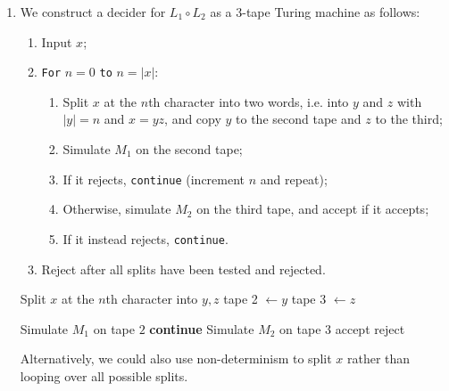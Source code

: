 \documentclass{article}
\theoremstyle{definition}
\theoremstyle{definition}
\theoremstyle{remark}
\begin{document}
\begin{enumerate}
    \item[$(ii)$] We construct a decider for $L_1\circ L_2$ as a $3$-tape Turing machine as follows:
    \begin{enumerate}
        \item[(1)] Input $x$;
        \item[(2)] \texttt{For} $n=0$ \texttt{to} $n=|x|$:
        \begin{enumerate}
            \item[(a)] Split $x$ at the $n$th character into two words, i.e. into $y$ and $z$ with $|y|=n$ and $x=yz$, and copy $y$ to the second tape and $z$ to the third;
            \item[(b)] Simulate $M_1$ on the second tape;
            \item[(c)] If it rejects, \texttt{continue} (increment $n$ and repeat);
            \item[(d)] Otherwise, simulate $M_2$ on the third tape, and accept if it accepts;
            \item[(e)] If it instead rejects, \texttt{continue}.
        \end{enumerate}
        \item Reject after all splits have been tested and rejected.
    \end{enumerate}

    \begin{algorithm}[H]
    \caption{Decide concatenation}
    \begin{algorithmic}[1]
            \State Split $x$ at the $n$th character into $y,z$
            \State tape 2 $\gets y$
            \State tape 3 $\gets z$

            \State Simulate $M_1$ on tape $2$
                \State \textbf{continue}
            \Else
                \State Simulate $M_2$ on tape $3$
                    \State \Return accept
                \EndIf
            \EndIf
        \EndFor
        \State \Return reject
    \EndProcedure
    \end{algorithmic}
    \end{algorithm}

    Alternatively, we could also use non-determinism to split $x$ rather than looping over all possible splits.
\end{enumerate}
\end{document}
